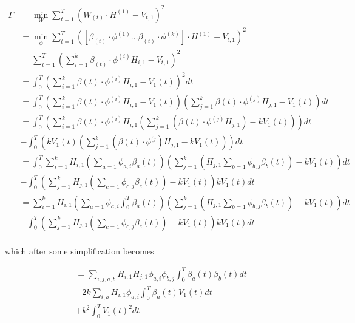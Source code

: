 \documentclass{article}
\begin{document}
  \begin{align*}
    \Gamma & = \min_W \sum_{t=1}^T (W_{(t)} \cdot H^{(1)} - V_{t,1})^2\\
    & = \min_{\phi} \sum_{t=1}^T ([\beta_{(t)} \cdot \phi^{(1)} \ldots \beta_{(t)} \cdot \phi^{(k)}] \cdot H^{(1)} - V_{t,1})^2\\
    & = \sum_{t=1}^T \left( \sum_{i=1}^k \beta_{(t)} \cdot \phi^{(i)} H_{i,1} - V_{t,1} \right)^2\\
    & = \int_0^T \left(\sum_{i=1}^k \beta(t) \cdot \phi^{(i)} H_{i,1} - V_1(t) \right)^2 dt\\
    & = \int_0^T \left(\sum_{i=1}^k \beta(t) \cdot \phi^{(i)} H_{i,1} - V_1(t) \right) \left(\sum_{j=1}^k \beta(t) \cdot \phi^{(j)} H_{j,1} - V_1(t) \right) dt\\
    & = \int_0^T \left( \sum_{i=1}^k \beta(t) \cdot \phi^{(i)} H_{i,1} \left( \sum_{j=1}^k \left( \beta(t) \cdot \phi^{(j)} H_{j,1} \right) - k V_1(t) \right) \right) dt\\
    & - \int_0^T \left( k V_1(t) \left( \sum_{j=1}^k \left(\beta(t) \cdot \phi^{(j} \right) H_{j,1} - k V_1(t) \right) \right) dt\\
    & = \int_0^T \sum_{i=1}^k H_{i,1} \left(\sum_{a=1} \phi_{a,i} \beta_a(t) \right) \left(\sum_{j=1}^k \left( H_{j,1} \sum_{b=1} \phi_{b,j} \beta_b(t) \right) - k V_1(t) \right) dt\\
    & - \int_0^T \left(\sum_{j=1}^k H_{j,1} \left(\sum_{c=1} \phi_{c,j} \beta_c(t) \right) - k V_1(t) \right) k V_1(t) dt\\
    & = \sum_{i=1}^k H_{i,1} \left(\sum_{a=1} \phi_{a,i} \int_0^T \beta_a(t) \right) \left(\sum_{j=1}^k \left(H_{j,1} \sum_{b=1} \phi_{b,j} \beta_b(t) \right) - k V_1(t) \right) dt\\
    & - \int_0^T \left(\sum_{j=1}^k H_{j,1} \left(\sum_{c=1} \phi_{c,j} \beta_c(t) \right) - k V_1(t) \right) k V_1(t) dt\\
  \end{align*}

which after some simplification becomes

  \begin{align*}
    & = \sum_{i,j,a,b} H_{i,1} H_{j,1} \phi_{a,i} \phi_{b,j} \int_0^T \beta_a(t) \beta_b(t) dt\\
    & - 2 k \sum_{i,a} H_{i,1} \phi_{a,i} \int_0^T \beta_a(t) V_1(t) dt\\
    & + k^2 \int_0^T V_1(t)^2 dt
  \end{align*}
\end{document}
